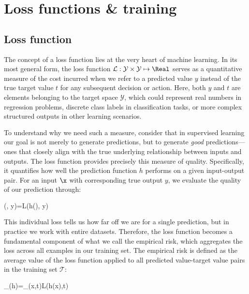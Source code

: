 
\chapter{Loss functions \& training}
\section*{Loss function}

The concept of a loss function lies at the very heart of machine learning. In its most general form, the loss function $\mathcal{L}:\mathcal{Y}\times\mathcal{Y}\mapsto\Real$ serves as a quantitative measure of the \alert{cost} incurred when we refer to a predicted value $y$ instead of the true target value $t$ for any subsequent decision or action. Here, both $y$ and $t$ are elements belonging to the target space $\mathcal{Y}$, which could represent real numbers in regression problems, discrete class labels in classification tasks, or more complex structured outputs in other learning scenarios.

\medskip

To understand why we need such a measure, consider that in supervised learning our goal is not merely to generate predictions, but to generate \emph{good} predictions—ones that closely align with the true underlying relationship between inputs and outputs. The loss function provides precisely this measure of quality. Specifically, it quantifies how well the prediction function $h$ performs on a given input-output pair. For an input $\x$ with corresponding true output $y$, we evaluate the quality of our prediction through: 
	\begin{myequation}
	(\x, y)=L(h(\x), y)
	\end{myequation}

This individual loss tells us how far off we are for a single prediction, but in practice we work with entire datasets. Therefore, the loss function becomes a fundamental component of what we call the \alert{empirical risk}, which aggregates the loss across all examples in our training set. The empirical risk is defined as the average value of the loss function applied to all predicted value-target value pairs in the training set $\mathcal{T}$:
\begin{myequation}
	_{}(h)=\sum_{(x,t)\in{}}L(h(x),t)
\end{myequation}

